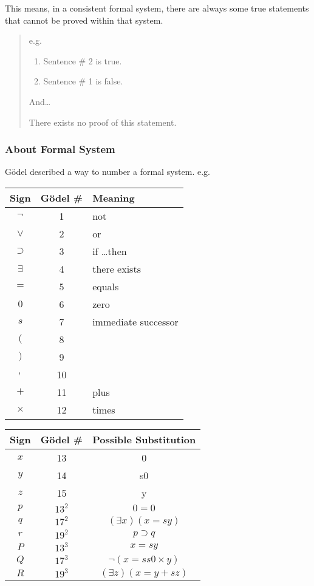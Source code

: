 \documentclass[a4paper, openany]{book}
\begin{document}
This means, in a consistent formal system, there are always some true statements that cannot be proved within that system. 

\begin{quote}
  e.g.
  \begin{enumerate}
    \item Sentence \# 2 is true.
    \item Sentence \# 1 is false.
  \end{enumerate}

  And\dots

  There exists no proof of this statement.
\end{quote}

\subsubsection{About Formal System}

Gödel described a way to number a formal system. e.g.

\hspace*{\fill}

\begin{tabular}{ccl}
  Sign & Gödel \# & Meaning \\
  \hline
  $\neg$ & 1 & not \\
  $\lor$ & 2 & or \\
  $\supset$ & 3 & if \dots then \\
  $\exists$ & 4 & there exists \\
  $=$ & 5 & equals \\
  $0$ & 6 & zero \\
  $s$ & 7 & immediate successor \\
  $($ & 8 & \\
  $)$ & 9 & \\
  $,$ & 10 & \\
  $+$ & 11 & plus \\
  $\times$ & 12 & times \\
\end{tabular}
\qquad
\begin{tabular}{ccc}
  Sign & Gödel \# & Possible Substitution \\
  \hline
  $x$ & 13 & 0 \\
  $y$ & 14 & s0 \\
  $z$ & 15 & y \\
  $p$ & $13^2$ & $0 = 0$ \\
  $q$ & $17^2$ & $( \exists x ) ( x = sy )$ \\
  $r$ & $19^2$ & $p \supset q$ \\
  $P$ & $13^3$ & $x = sy$ \\
  $Q$ & $17^3$ & $\neg ( x = ss0 \times y )$ \\
  $R$ & $19^3$ & $( \exists z ) ( x = y + sz )$
\end{tabular}
\end{document}

